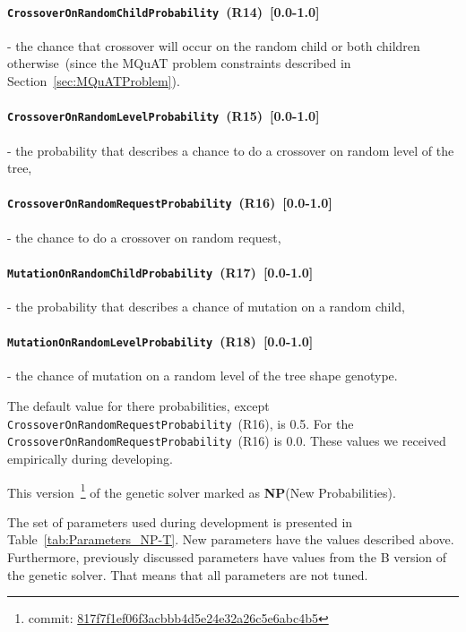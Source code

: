 \paragraph{\texttt{CrossoverOnRandomChildProbability}~(R14)~[0.0-1.0]} - the chance that crossover will occur on the random child or both children otherwise~(since the MQuAT problem constraints described in Section~\ref{sec:MQuATProblem}).
\paragraph{\texttt{CrossoverOnRandomLevelProbability}~(R15)~[0.0-1.0]} - the probability that describes a chance to do a crossover on random level of the tree, 
\paragraph{\texttt{CrossoverOnRandomRequestProbability}~(R16)~[0.0-1.0]} - the chance to do a crossover on random request,
\paragraph{\texttt{MutationOnRandomChildProbability}~(R17)~[0.0-1.0]} - the probability that describes a chance of mutation on a random child,
\paragraph{\texttt{MutationOnRandomLevelProbability}~(R18)~[0.0-1.0]} - the chance of mutation on a random level of the tree shape genotype.

The default value for there probabilities, except \texttt{Cross\-ov\-er\-On\-Ran\-dom\-Re\-qu\-est\-Pro\-ba\-bi\-li\-ty}~(R16), is 0.5. For the \texttt{CrossoverOnRandomRequestProbability}~(R16) is 0.0. These values we received empirically during developing.

This version~\footnote{commit: \href{https://git-st.inf.tu-dresden.de/mquat/mquat2/commit/817f7f1ef06f3acbbb4d5e24e32a26c5e6abc4b5}{817f7f1ef06f3acbbb4d5e24e32a26c5e6abc4b5}} of the genetic solver marked as \textbf{NP}(New Probabilities).

The set of parameters used during development is presented in Table~\ref{tab:Parameters_NP-T}. New parameters have the values described above. Furthermore, previously discussed parameters have values from the B version of the genetic solver. That means that all parameters are not tuned.


